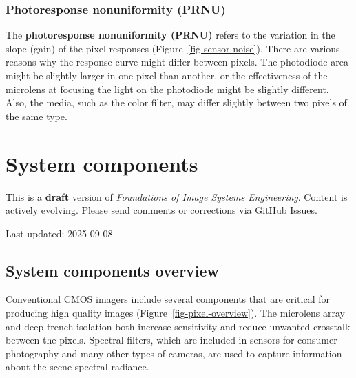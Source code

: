 \documentclass[
  letterpaper,
]{book}
\begin{document}
\subsection{Photoresponse nonuniformity
(PRNU)}\label{sec-photoresponse-nonuniformity}

The \textbf{photoresponse nonuniformity (PRNU)} refers to the variation
in the slope (gain) of the pixel responses
(Figure~\ref{fig-sensor-noise}). There are various reasons why the
response curve might differ between pixels. The photodiode area might be
slightly larger in one pixel than another, or the effectiveness of the
microlens at focusing the light on the photodiode might be slightly
different. Also, the media, such as the color filter, may differ
slightly between two pixels of the same type.

\chapter{System components}\label{sec-sensor-components}

\begin{tcolorbox}[enhanced jigsaw, opacityback=0, breakable, coltitle=black, leftrule=.75mm, left=2mm, colframe=quarto-callout-warning-color-frame, opacitybacktitle=0.6, bottomtitle=1mm, bottomrule=.15mm, toprule=.15mm, title=\textcolor{quarto-callout-warning-color}{\faExclamationTriangle}\hspace{0.5em}{Work in Progress}, titlerule=0mm, toptitle=1mm, colback=white, rightrule=.15mm, colbacktitle=quarto-callout-warning-color!10!white, arc=.35mm]

This is a \textbf{draft} version of \emph{Foundations of Image Systems
Engineering}. Content is actively evolving. Please send comments or
corrections via \href{https://github.com/wandell/FISE-git/issues}{GitHub
Issues}.

Last updated: 2025-09-08

\end{tcolorbox}

\section{System components
overview}\label{sec-sensor-components-overview}

Conventional CMOS imagers include several components that are critical
for producing high quality images (Figure~\ref{fig-pixel-overview}). The
microlens array and deep trench isolation both increase sensitivity and
reduce unwanted crosstalk between the pixels. Spectral filters, which
are included in sensors for consumer photography and many other types of
cameras, are used to capture information about the scene spectral
radiance.
\end{document}
